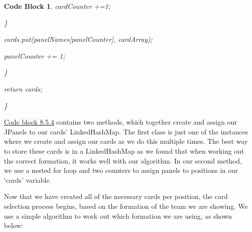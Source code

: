 \documentclass[12pt, a4paper, oneside]{book}
\newtheorem{codeblock}[theorem]{Code Block}
\numberwithin{equation}{section}
\begin{document}
\begin{codeblock}
  \hspace{\parindent}\hspace{\parindent}\hspace{\parindent}cardCounter +=1;
            
  \hspace{\parindent}\hspace{\parindent}\}
            
  \hspace{\parindent}\hspace{\parindent}cards.put(panelNames[panelCounter], cardArray);
            
  \hspace{\parindent}\hspace{\parindent}panelCounter += 1;
        
  \hspace{\parindent}\}
        
  \hspace{\parindent}return cards;
    
  \}

\end{codeblock}

\hyperref[Create cards]{Code block 8.5.4} contains two methods, which together create and assign our JPanels to our cards' LinkedHashMap. The first class is just one of the instances where we create and assign our cards as we do this multiple times. The best way to store these cards is in a LinkedHashMap as we found that when working out the correct formation, it works well with our algorithm. In our second method, we use a nested for loop and two counters to assign panels to positions in our `cards' variable.

Now that we have created all of the necessary cards per position, the card selection process begins, based on the formation of the team we are showing. We use a simple algorithm to work out which formation we are using, as shown below:
\end{document}
